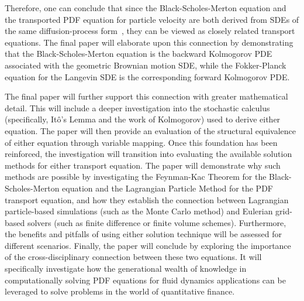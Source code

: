 \documentclass[12pt, onecolumn, journal]{IEEEtran}
\begin{document}
\noindent Therefore, one can conclude that since the Black-Scholes-Merton equation and the transported PDF equation for particle velocity are both derived from SDEs of the same diffusion-process form~\cite{Pope2000}, they can be viewed as closely related transport equations. The final paper will elaborate upon this connection by demonstrating that the Black-Scholes-Merton equation is the backward Kolmogorov PDE associated with the geometric Brownian motion SDE, while the Fokker-Planck equation for the Langevin SDE is the corresponding forward Kolmogorov PDE.

The final paper will further support this connection with greater mathematical detail. This will include a deeper investigation into the stochastic calculus (specifically, Itô's Lemma and the work of Kolmogorov) used to derive either equation. The paper will then provide an evaluation of the structural equivalence of either equation through variable mapping. Once this foundation has been reinforced, the investigation will transition into evaluating the available solution methods for either transport equation. The paper will demonstrate why such methods are possible by investigating the Feynman-Kac Theorem for the Black-Scholes-Merton equation and the Lagrangian Particle Method for the PDF transport equation, and how they establish the connection between Lagrangian particle-based simulations (such as the Monte Carlo method) and Eulerian grid-based solvers (such as finite difference or finite volume schemes). Furthermore, the benefits and pitfalls of using either solution technique will be assessed for different scenarios. Finally, the paper will conclude by exploring the importance of the cross-disciplinary connection between these two equations. It will specifically investigate how the generational wealth of knowledge in computationally solving PDF equations for fluid dynamics applications can be leveraged to solve problems in the world of quantitative finance.


\newpage

\end{document}
